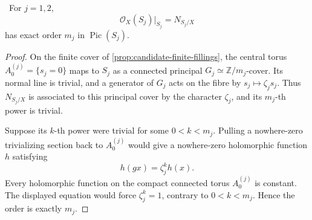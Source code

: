 \begin{lemma}
\label{lem:finite-normal-order-audit}
\Verified\ For \(j=1,2\),
\[
 \mathcal O_X(S_j)|_{S_j}=N_{S_j/X}
\]
has exact order \(m_j\) in \(\operatorname{Pic}(S_j)\).
\end{lemma}

\begin{proof}
On the finite cover of \cref{prop:candidate-finite-fillings}, the central
torus \(A_0^{(j)}=\{s_j=0\}\) maps to \(S_j\) as a connected principal
\(G_j\simeq\mathbb Z/m_j\)-cover.  Its normal line is trivial, and a
generator of \(G_j\) acts on the fibre by
\(s_j\mapsto\zeta_js_j\).  Thus \(N_{S_j/X}\) is associated to this
principal cover by the character \(\zeta_j\), and its \(m_j\)-th power is
trivial.

Suppose its \(k\)-th power were trivial for some \(0<k<m_j\).  Pulling a
nowhere-zero trivializing section back to \(A_0^{(j)}\) would give a
nowhere-zero holomorphic function \(h\) satisfying
\[
 h(gx)=\zeta_j^{k}h(x).
\]
Every holomorphic function on the compact connected torus \(A_0^{(j)}\)
is constant.  The displayed equation would force \(\zeta_j^k=1\), contrary
to \(0<k<m_j\).  Hence the order is exactly \(m_j\).
\end{proof}
